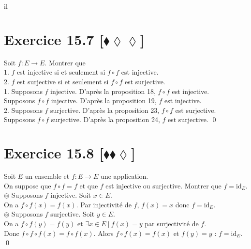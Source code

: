 il\documentclass[10pt]{article}
\begin{document}
\section*{Exercice 15.7 [$\blacklozenge\lozenge\lozenge$]}
\begin{tcolorbox}[enhanced, width=7.6in, center, size=fbox, fontupper=\large, drop shadow southwest]
    Soit $f:E\to E$. Montrer que\\
    1. $f$ est injective si et seulement si $f \circ f$ est injective.\\
    2. $f$ est surjective si et seulement si $f \circ f$ est surjective.\\
    1. Supposons $f$ injective. D'après la proposition 18, $f \circ f$ est injective.\\
    Supposons $f \circ f$ injective. D'après la proposition 19, $f$ est injective.\\
    2. Supposons $f$ surjective. D'après la proposition 23, $f \circ f$ est surjective.\\
    Supposons $f \circ f$ surjective. D'après la proposition 24, $f$ est surjective.
    \qed
\end{tcolorbox}

\section*{Exercice 15.8 [$\blacklozenge\blacklozenge\lozenge$]}
\begin{tcolorbox}[enhanced, width=7.6in, center, size=fbox, fontupper=\large, drop shadow southwest]
    Soit $E$ un ensemble et $f:E\to E$ une application.\\
    On suppose que $f\circ f = f$ et que $f$ est injective ou surjective. Montrer que $f = \text{id}_E$.\\[0.2cm]
    $\circledcirc$ Supposons $f$ injective. Soit $x \in E$.\\
    On a $f \circ f (x) = f(x)$. Par injectivité de $f$, $f(x) = x$ donc $f = \text{id}_E$.\\[0.15cm]
    $\circledcirc$ Supposons $f$ surjective. Soit $y \in E$.\\
    On a $f \circ f (y) = f(y)$ et $\exists x \in E ~ | ~ f(x) = y$ par surjectivité de $f$.\\
    Donc $f \circ f \circ f (x) = f \circ f (x)$. Alors $f \circ f (x) = f(x)$ et $f(y) = y$ : $f = \text{id}_E$.\\
    \qed
\end{tcolorbox}
\end{document}
